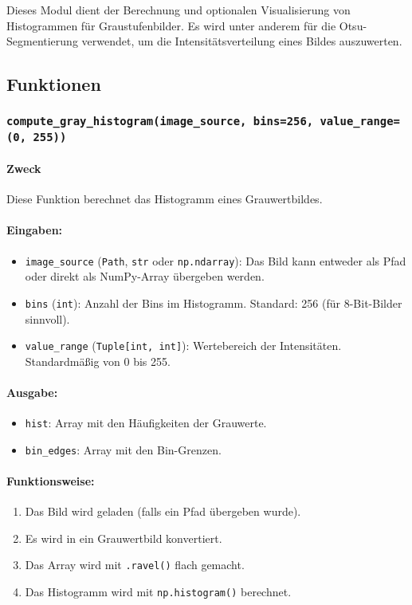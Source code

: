 \documentclass[a4paper,12pt]{article}
\begin{document}
Dieses Modul dient der Berechnung und optionalen Visualisierung von Histogrammen für Graustufenbilder. Es wird unter anderem für die Otsu-Segmentierung verwendet, um die Intensitätsverteilung eines Bildes auszuwerten.

\subsection*{Funktionen}

\subsubsection*{\texttt{compute\_gray\_histogram(image\_source, bins=256, value\_range=(0, 255))}}

\paragraph{Zweck}
Diese Funktion berechnet das Histogramm eines Grauwertbildes.

\paragraph{Eingaben:}
\begin{itemize}
  \item \texttt{image\_source} (\texttt{Path}, \texttt{str} oder \texttt{np.ndarray}): Das Bild kann entweder als Pfad oder direkt als NumPy-Array übergeben werden.
  \item \texttt{bins} (\texttt{int}): Anzahl der Bins im Histogramm. Standard: 256 (für 8-Bit-Bilder sinnvoll).
  \item \texttt{value\_range} (\texttt{Tuple[int, int]}): Wertebereich der Intensitäten. Standardmäßig von 0 bis 255.
\end{itemize}

\paragraph{Ausgabe:}
\begin{itemize}
  \item \texttt{hist}: Array mit den Häufigkeiten der Grauwerte.
  \item \texttt{bin\_edges}: Array mit den Bin-Grenzen.
\end{itemize}

\paragraph{Funktionsweise:}
\begin{enumerate}
  \item Das Bild wird geladen (falls ein Pfad übergeben wurde).
  \item Es wird in ein Grauwertbild konvertiert.
  \item Das Array wird mit \texttt{.ravel()} flach gemacht.
  \item Das Histogramm wird mit \texttt{np.histogram()} berechnet.
\end{enumerate}
\end{document}

